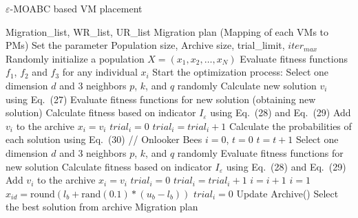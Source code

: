 \documentclass[UTF8, fontset=windows]{article}
\begin{document}
\begin{algorithm}[b]
  \caption{$\varepsilon$-MOABC based VM placement}
  \begin{algorithmic}[1]
  \REQUIRE Migration\_list, WR\_list, UR\_list
  \ENSURE Migration plan (Mapping of each VMs to PMs)
  \STATE Set the parameter Population size, Archive size, trial\_limit, $iter_{max}$
  \STATE Randomly initialize a population $X = (x_1, x_2, \ldots, x_N)$
  \STATE Evaluate fitness functions $f_1$, $f_2$ and $f_3$ for any individual $x_i$
  \STATE Start the optimization process:
          \STATE Select one dimension $d$ and 3 neighbors $p$, $k$, and $q$ randomly
          \STATE Calculate new solution $v_i$ using Eq.~(27)
          \STATE Evaluate fitness functions for new solution (obtaining new solution)
          \STATE Calculate fitness based on indicator $I_{\varepsilon}$ using Eq.~(28) and Eq.~(29)
              \STATE Add $v_i$ to the archive
              \STATE $x_i = v_i$
              \STATE $trial_i = 0$
          \ELSE
              \STATE $trial_i = trial_i + 1$
          \ENDIF
      \ENDFOR
      \STATE Calculate the probabilities of each solution using Eq.~(30) // Onlooker Bees
      \STATE $i = 0$, $t = 0$
              \STATE $t = t + 1$
              \STATE Select one dimension $d$ and 3 neighbors $p$, $k$, and $q$ randomly
              \STATE Evaluate fitness functions for new solution
              \STATE Calculate fitness based on indicator $I_{\varepsilon}$ using Eq.~(28) and Eq.~(29)
                  \STATE Add $v_i$ to the archive
                  \STATE $x_i = v_i$
                  \STATE $trial_i = 0$
              \ELSE
                  \STATE $trial_i = trial_i + 1$
              \ENDIF
          \ENDIF
          \STATE $i = i + 1$
              \STATE $i = 1$
          \ENDIF
      \ENDWHILE
                  \STATE $x_{id} = \text{round}(l_b + \text{rand}(0.1) * (u_b - l_b))$
              \ENDFOR
              \STATE $trial_i = 0$
          \ENDIF
      \ENDFOR
      \STATE Update Archive()
  \ENDWHILE
  \STATE Select the best solution from archive
  \RETURN Migration plan
  \end{algorithmic}
  \label{alg:moabc}
  \end{algorithm}



\end{document}
